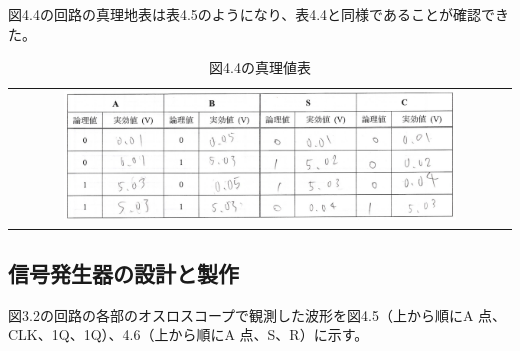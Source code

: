 \documentclass{jlreq}
\numberwithin{equation}{section}
\begin{document}
図4.4の回路の真理地表は表4.5のようになり、表4.4と同様であることが確認できた。

\begin{table}[H]
  \centering
  \caption{図4.4の真理値表}
  \begin{tabular}{c}
    \includegraphics[width=0.8\textwidth]{assets/hanandnotshinri.png} \\
  \end{tabular}
\end{table}

\subsection{信号発生器の設計と製作}
図3.2の回路の各部のオスロスコープで観測した波形を図4.5（上から順にA 点、CLK、1Q、1Q）、4.6（上から順にA 点、S、R）に示す。
\end{document}
